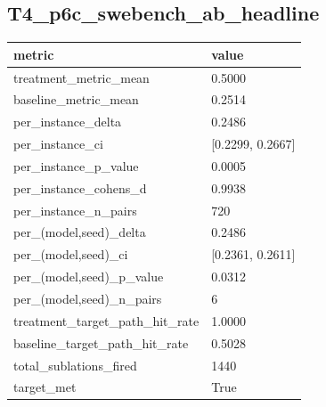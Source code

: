 \subsection*{T4\_p6c\_swebench\_ab\_headline}
{\def\LTcaptype{none} %
\begin{longtable}[]{@{}ll@{}}
\toprule\noalign{}
metric & value \\
\midrule\noalign{}
\endhead
\bottomrule\noalign{}
\endlastfoot
treatment\_metric\_mean & 0.5000 \\
baseline\_metric\_mean & 0.2514 \\
per\_instance\_delta & 0.2486 \\
per\_instance\_ci & {[}0.2299, 0.2667{]} \\
per\_instance\_p\_value & 0.0005 \\
per\_instance\_cohens\_d & 0.9938 \\
per\_instance\_n\_pairs & 720 \\
per\_(model,seed)\_delta & 0.2486 \\
per\_(model,seed)\_ci & {[}0.2361, 0.2611{]} \\
per\_(model,seed)\_p\_value & 0.0312 \\
per\_(model,seed)\_n\_pairs & 6 \\
treatment\_target\_path\_hit\_rate & 1.0000 \\
baseline\_target\_path\_hit\_rate & 0.5028 \\
total\_sublations\_fired & 1440 \\
target\_met & True \\
\end{longtable}
}

